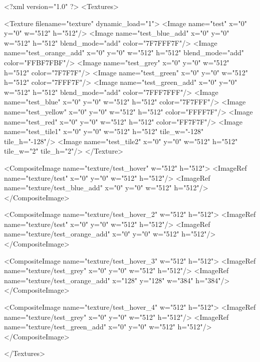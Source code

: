 <?xml version="1.0" ?>
<Textures>

	<Texture filename="texture" dynamic_load="1">
		<Image name="test" x="0" y="0" w="512" h="512"/>
		<Image name="test_blue_add" x="0" y="0" w="512" h="512" blend_mode="add" color="7F7FFF7F"/>
		<Image name="test_orange_add" x="0" y="0" w="512" h="512" blend_mode="add" color="FFBF7FBF"/>
		<Image name="test_grey" x="0" y="0" w="512" h="512" color="7F7F7F"/>
		<Image name="test_green" x="0" y="0" w="512" h="512" color="7FFF7F"/>
		<Image name="test_green_add" x="0" y="0" w="512" h="512" blend_mode="add" color="7FFF7FFF"/>
		<Image name="test_blue" x="0" y="0" w="512" h="512" color="7F7FFF"/>
		<Image name="test_yellow" x="0" y="0" w="512" h="512" color="FFFF7F"/>
		<Image name="test_red" x="0" y="0" w="512" h="512" color="FF7F7F"/>
		<Image name="test_tile1" x="0" y="0" w="512" h="512" tile_w="-128" tile_h="-128"/>
		<Image name="test_tile2" x="0" y="0" w="512" h="512" tile_w="2" tile_h="2"/>
	</Texture>
	
	<CompositeImage name="texture/test_hover" w="512" h="512">
		<ImageRef name="texture/test" x="0" y="0" w="512" h="512"/>
		<ImageRef name="texture/test_blue_add" x="0" y="0" w="512" h="512"/>
	</CompositeImage>
	
	<CompositeImage name="texture/test_hover_2" w="512" h="512">
		<ImageRef name="texture/test" x="0" y="0" w="512" h="512"/>
		<ImageRef name="texture/test_orange_add" x="0" y="0" w="512" h="512"/>
	</CompositeImage>
	
	<CompositeImage name="texture/test_hover_3" w="512" h="512">
		<ImageRef name="texture/test_grey" x="0" y="0" w="512" h="512"/>
		<ImageRef name="texture/test_orange_add" x="128" y="128" w="384" h="384"/>
	</CompositeImage>
	
	<CompositeImage name="texture/test_hover_4" w="512" h="512">
		<ImageRef name="texture/test_grey" x="0" y="0" w="512" h="512"/>
		<ImageRef name="texture/test_green_add" x="0" y="0" w="512" h="512"/>
	</CompositeImage>
	
</Textures>
